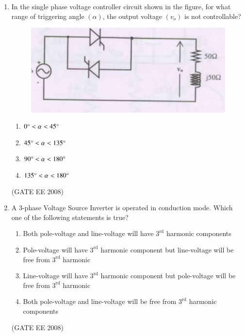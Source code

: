 \documentclass[journal,12pt,onecolumn]{IEEEtran}
\theoremstyle{remark}
\begin{document}
\begin{enumerate}[start=1, label=Q.\arabic*]
\item In the single phase voltage controller circuit shown in the figure, for what range of triggering angle $(\alpha)$, the output voltage $(v_{o})$ is not controllable?

\begin{figure}[H]
    \centering
    \includegraphics[width=\columnwidth]{Fig/q17.png}
    \caption{}
\end{figure}

\begin{multicols}{2}
    \begin{enumerate}
        \item $0\degree < \alpha < 45\degree$
        \item $45\degree < \alpha < 135\degree$
        \item $90\degree< \alpha < 180\degree$
        \item $135\degree < \alpha < 180\degree$
    \end{enumerate}
\end{multicols}
\hfill (GATE EE 2008)



\item A 3-phase Voltage Source Inverter is operated in  conduction mode. Which one of the following statements is true?

\begin{enumerate}
    \item Both pole-voltage and line-voltage will have $3^{\text{rd}}$ harmonic components
    \item Pole-voltage will have $3^{\text{rd}}$ harmonic component but line-voltage will be free from $3^{\text{rd}}$ harmonic
    \item Line-voltage will have $3^{\text{rd}}$ harmonic component but pole-voltage will be free from $3^{\text{rd}}$ harmonic
    \item Both pole-voltage and line-voltage will be free from $3^{\text{rd}}$ harmonic components
\end{enumerate}
\hfill (GATE EE 2008)



\end{enumerate}
\end{document}

